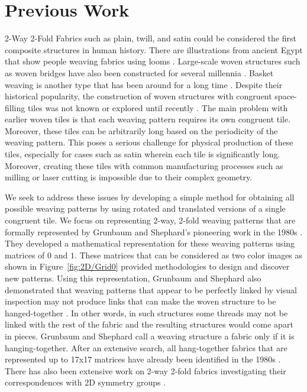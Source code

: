 \documentclass[times,twocolumn,final]{elsarticle}
\begin{document}
\section{Previous Work}

2-Way 2-Fold Fabrics such as plain, twill, and satin could be considered the first composite structures in human history. There are illustrations  from ancient Egypt that show people weaving fabrics using looms \cite{baines2015history}. Large-scale woven structures such as woven bridges have also been constructed for several millennia \cite{yan2020woven,yan2019building,janssen2000designing,kieran2008architectural}. Basket weaving is another type that has been around for a long time \cite{mallos2009weave,ren20213d,georgescu2021weaving,baek2021smooth}. Despite their historical popularity, the construction of woven structures with congruent space-filling tiles was not known or explored until recently \cite{krishnamurthy2020bi,krishnamurthy2021geometrically}. The main problem with earlier woven tiles is that each weaving pattern requires its own congruent tile. Moreover, these tiles can be arbitrarily long based on the periodicity of the weaving pattern. This poses a serious challenge for physical production of these tiles, especially for cases such as satin wherein each tile is significantly long.
Moreover, creating these tiles with common manufacturing processes such as milling or laser cutting is impossible due to their complex geometry. 

We seek to address these issues by developing a simple method for obtaining all possible weaving patterns by using rotated and translated versions of a single congruent tile. We focus on representing 2-way, 2-fold weaving patterns that are formally represented by Grunbaum and Shephard's pioneering work in the 1980s \cite{Grunbaum80}. They developed a mathematical representation for these weaving patterns using matrices of $0$ and $1$. These matrices that can be considered as two color images as shown in Figure~\ref{fig:2D/Grid0} provided methodologies to design and discover new patterns. Using this representation, Grunbaum and Shephard also demonstrated that weaving patterns that appear to be perfectly linked by visual inspection may not produce links that can make the woven structure to be hanged-together \cite{Grunbaum85, Grunbaum86, Griswold2004a, Griswold2004b, Griswold2004c}. In other words, in such structures some threads may not be linked with the rest of the fabric and the resulting structures would come apart in pieces. Grunbaum and Shephard call a weaving structure a fabric only if it is hanging-together. After an extensive search, all hang-together fabrics that are represented up to 17x17 matrices have already been identified in the 1980s \cite{Grunbaum85, Grunbaum86, Clapham80, Enns84, Clapham85, Delaney84}. There has also been extensive work on 2-way 2-fold fabrics investigating their correspondences with 2D symmetry groups
\cite{Zelinka1983,Zelinka1984,Roth1993,Thomas2010,Thomas2009,Thomas2009a}.
\end{document}
